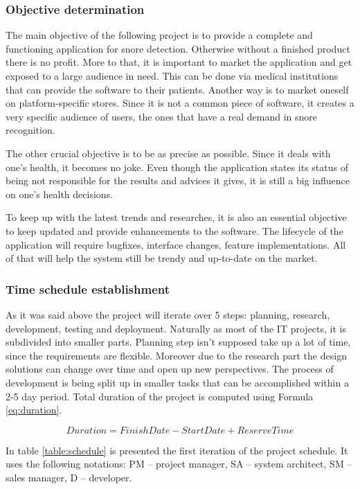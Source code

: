 \subsubsection{Objective determination}
The main objective of the following project is to provide a complete and functioning application for snore detection. Otherwise without a finished product there is no profit. More to that, it is important to market the application and get exposed to a large audience in need. This can be done via medical institutions that can provide the software to their patients. Another way is to market oneself on platform-specific stores. Since it is not a common piece of software, it creates a very specific audience of users, the ones that have a real demand in snore recognition. 

The other crucial objective is to be as precise as possible. Since it deals with one's health, it becomes no joke. Even though the application states its status of being not responsible for the results and advices it gives, it is still a big influence on one's health decisions. 

To keep up with the latest trends and researches, it is also an essential objective to keep updated and provide enhancements to the software. The lifecycle of the application will require bugfixes, interface changes, feature implementations. All of that will help the system still be trendy and up-to-date on the market.

\subsubsection{Time schedule establishment}
As it was said above the project will iterate over 5 steps: planning, research, development, testing and deployment. Naturally as most of the IT projects, it is subdivided into smaller parts. Planning step isn't supposed take up a lot of time, since the requirements are flexible. Moreover due to the research part the design solutions can change over time and open up new perspectives. The process of development is being split up in smaller tasks that can be accomplished within a 2-5 day period. Total duration of the project is computed using Formula \eqref{eq:duration}.

\begin{equation} \label{eq:duration}
 Duration = FinishDate - StartDate + ReserveTime
\end{equation}

In table \ref{table:schedule} is presented the first iteration of the project schedule. It uses the following notations: PM -- project manager, SA -- system architect, SM -- sales manager, D -- developer.

